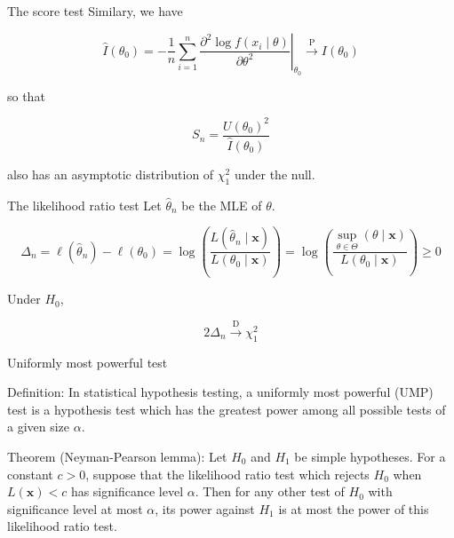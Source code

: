 \documentclass[
  ignorenonframetext,
]{beamer}
\begin{document}
\begin{frame}{The score test}
\protect{}\label{the-score-test-1}
Similary, we have

\[
\widehat{I}\left(\theta_{0}\right)=-\left.\frac{1}{n} \sum_{i=1}^{n} \frac{\partial^{2} \log f\left(x_{i} \mid \theta\right)}{\partial \theta^{2}}\right|_{\theta_{0}} \stackrel{\mathrm{P}}{\rightarrow} I\left(\theta_{0}\right)
\]

so that

\[
S_n = \frac{U(\theta_0)^2}{\widehat{I}\left(\theta_{0}\right)}
\]

also has an asymptotic distribution of \(\chi^2_1\) under the null.
\end{frame}

\begin{frame}{The likelihood ratio test}
\protect{}\label{the-likelihood-ratio-test}
Let \(\hat{\theta}_n\) be the MLE of \(\theta\).

\[
\Delta_{n}= \ell\left(\widehat{\theta}_{n}\right)-\ell\left(\theta_{0}\right) =\log \left(\frac{L(\hat{\theta}_n\mid\mathbf{x})}{L\left(\theta_{0} \mid \mathbf{x}\right)}\right) =\log \left(\frac{\sup _{\theta \in \Theta}(\theta \mid \mathbf{x})}{L\left(\theta_{0} \mid \mathbf{x}\right)}\right) \geq 0
\]

Under \(H_0\),

\[
2 \Delta_{n} \stackrel{\mathrm{D}}{\rightarrow} \chi_{1}^{2}
\]
\end{frame}

\begin{frame}{Uniformly most powerful test}
\protect{}\label{uniformly-most-powerful-test}
\begin{block}{Definition:}
\protect{}\label{definition-1}
In statistical hypothesis testing, a uniformly most powerful (UMP) test
is a hypothesis test which has the greatest power among all possible
tests of a given size \(\alpha\).
\end{block}

\begin{block}{Theorem (Neyman-Pearson lemma):}
\protect{}\label{theorem-neyman-pearson-lemma}
Let \(H_0\) and \(H_1\) be simple hypotheses. For a constant \(c>0\),
suppose that the likelihood ratio test which rejects \(H_0\) when
\(L(\mathbf{x})<c\) has significance level \(\alpha\). Then for any
other test of \(H_0\) with significance level at most \(\alpha\), its
power against \(H_1\) is at most the power of this likelihood ratio
test.
\end{block}
\end{frame}
\end{document}
